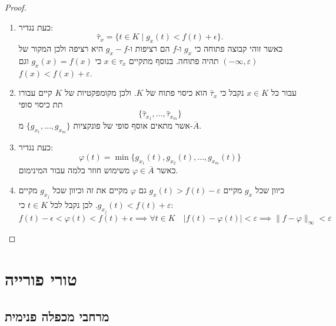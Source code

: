 \documentclass{tstextbook}
\begin{document}
\begin{proof}
\begin{enumerate}
    \item כעת נגדיר: 
$${\hat{\tau}}_{x}=\{t\in K\mid g_{x}(t)<f(t)+\epsilon\}.$$
כאשר זוהי קבוצה פתוחה כי \(g_{x}\) ו-\(f\) הם רציפות ו-\(g_{x}-f\) היא רציפה ולכן המקור של \((-\infty,\varepsilon)\) תהיה פתוחה. בנוסף מתקיים \(x \in \hat{\tau}_{x}\) כי \(g_{x}(x)=f(x)\) וגם \(f(x)<f(x)+\varepsilon\). 


    \item עבור כל \(x \in K\) נקבל כי \(\hat{\tau}_{x}\) הוא כיסוי פתוח של \(K\). ולכן מקומפקטיות של \(K\) קיים עבורו תת כיסוי סופי 
$$\{ \hat{\tau}_{x_{1}},\dots,\hat{\tau}_{x_{m}} \}$$
אשר מתאים אוסף סופי של פונקציות \(\{ g_{x_{1}},\dots,g_{x_{m}} \}\) מ-\(\overline{A}\).


    \item כעת נגדיר: 
$$\varphi(t)=\operatorname*{min}\{g_{x_{1}}(t),g_{x_{2}}(t),\ldots,g_{x_{m}}(t)\}$$
כאשר \(\varphi \in \overline{A}\) משימוש חוזר בלמה עבור המינימום.


    \item כיוון שכל \(g_{x}\) מקיים \(g_{x}(t)>f(t)-\varepsilon\) גם \(\varphi\) מקיים את זה וכיוון שכל \(g_{x_{j}}\) מקיים \(g_{x_{j}}(t)<f(t)+\varepsilon\). לכן נקבל לכל \(t \in K\) כי: 
$$f(t)-\epsilon<\varphi(t)<f(t)+\epsilon\implies \forall t \in K\quad |f(t)-\varphi(t)|<\varepsilon\implies \lVert f-\varphi \rVert _{\infty}<\varepsilon$$


  \end{enumerate}
\end{proof}
\chapter{טורי פורייה}

\section{מרחבי מכפלה פנימית}
\end{document}
